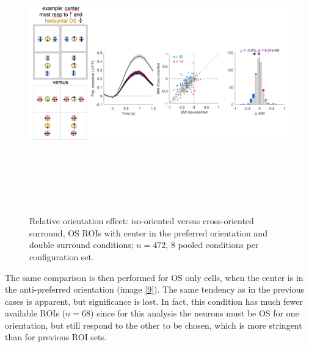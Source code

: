 \begin{figure}[H] \centering \includegraphics[width=12cm,height=12cm,keepaspectratio]{Figures/7.Results/finalPopulation/sel/diagrams/8.png} 
\caption{Relative orientation effect: iso-oriented versus cross-oriented surround, OS ROIs with center in the preferred orientation and double surround conditions;  $n=472$, 8 pooled conditions per configuration set.} \label{8}
\end{figure}

The same comparison is then performed for OS only cells, when the center is in the anti-preferred orientation (image \ref{9}). The same tendency as in the previous cases is apparent, but significance is lost. In fact, this condition has much fewer available ROIs ($n=68$) since for this analysis the neurons must be OS for one orientation, but still respond to the other to be chosen, which is more stringent than for previous ROI sets.

